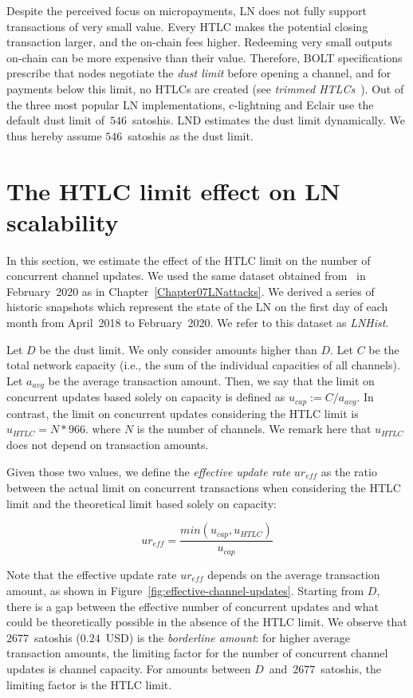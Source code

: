 Despite the perceived focus on micropayments, LN does not fully support transactions of very small value.
Every HTLC makes the potential closing transaction larger, and the on-chain fees higher.
Redeeming very small outputs on-chain can be more expensive than their value.
Therefore, BOLT specifications prescribe that nodes negotiate the \textit{dust limit} before opening a channel, and for payments below this limit, no HTLCs are created (see \textit{trimmed HTLCs}~\cite{BOLT3Trimmed}).
Out of the three most popular LN implementations, c-lightning and Eclair use the default dust limit of~$546$~satoshis.
LND estimates the dust limit dynamically.
We thus hereby assume $546$~satoshis as the dust limit.


\section{The HTLC limit effect on LN scalability}

In this section, we estimate the effect of the HTLC limit on the number of concurrent channel updates.
We used the same dataset obtained from~\cite{fiatjaf2020} in February~2020 as in Chapter~\ref{Chapter07LNattacks}.
We derived a series of historic snapshots which represent the state of the LN on the first day of each month from April~2018 to February~2020.
We refer to this dataset as \textit{LNHist}.

Let $D$ be the dust limit.
We only consider amounts higher than $D$.
Let $C$ be the total network capacity (i.e., the sum of the individual capacities of all channels).
Let $a_\textit{avg}$ be the average transaction amount.
Then, we say that the limit on concurrent updates based solely on capacity is defined as $u_\textit{cap} := C / a_\textit{avg}$.
In contrast, the limit on concurrent updates considering the HTLC limit is $u_\textit{HTLC} = N * 966$.
where $N$ is the number of channels. We remark here that $u_\textit{HTLC}$ does not depend on transaction amounts.

Given those two values, we define the \textit{effective update rate} $ur_\textit{eff}$ as the ratio between the actual limit on concurrent transactions when considering the HTLC limit and the theoretical limit based solely on capacity:

\[ur_\textit{eff} = \frac{min(u_\textit{cap}, u_\textit{HTLC})}{u_\textit{cap}}\]

Note that the effective update rate $ur_\textit{eff}$ depends on the average transaction amount, as shown in Figure~\ref{fig:effective-channel-updates}.
Starting from $D$, there is a gap between the effective number of concurrent updates and what could be theoretically possible in the absence of the HTLC limit.
We observe that $2677$~satoshis ($0.24$~USD) is the \textit{borderline amount}: for higher average transaction amounts, the limiting factor for the number of concurrent channel updates is channel capacity.
For amounts between $D$~and~$2677$~satoshis, the limiting factor is the HTLC limit.

